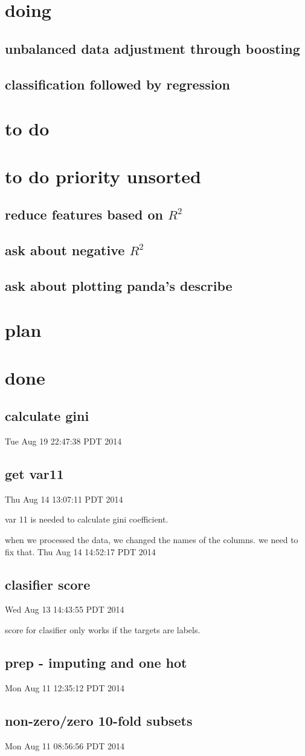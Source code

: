 \documentclass{article}
\begin{document}
\section{doing}
\subsection{unbalanced data adjustment through boosting}
\subsection{classification followed by regression}
\section{to do}
\section{to do priority unsorted}
\subsection{reduce features based on $R^2$}
\subsection{ask about negative $R^2$}
\subsection{ask about plotting panda's describe}
\section{plan}
\section{done}
\subsection{calculate gini}
Tue Aug 19 22:47:38 PDT 2014
\subsection{get var11}
Thu Aug 14 13:07:11 PDT 2014

var 11 is needed to calculate gini coefficient.

when we processed the data, we changed the names of the columns. we need to fix that.
Thu Aug 14 14:52:17 PDT 2014
\subsection{clasifier score}
Wed Aug 13 14:43:55 PDT 2014

score for clasifier only works if the targets are labels.
\subsection{prep - imputing and one hot}
Mon Aug 11 12:35:12 PDT 2014
\subsection{non-zero/zero 10-fold subsets}
Mon Aug 11 08:56:56 PDT 2014
\end{document}
